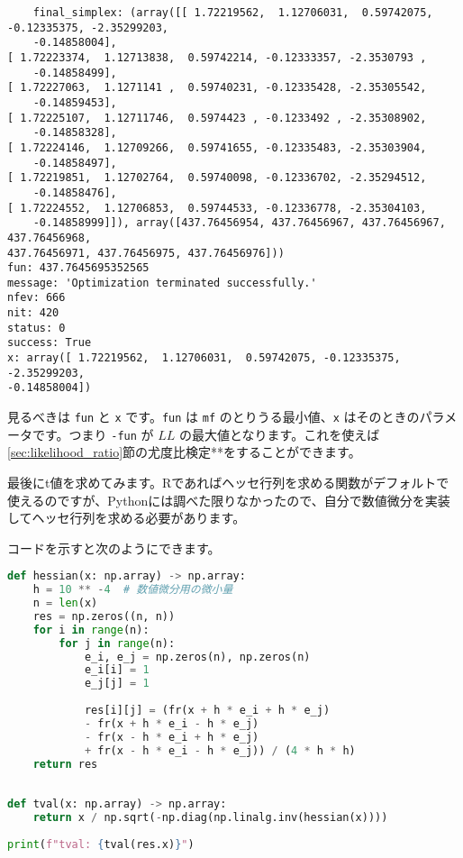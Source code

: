     \begin{lstlisting}
    final_simplex: (array([[ 1.72219562,  1.12706031,  0.59742075, -0.12335375, -2.35299203,
    -0.14858004],
[ 1.72223374,  1.12713838,  0.59742214, -0.12333357, -2.3530793 ,
    -0.14858499],
[ 1.72227063,  1.1271141 ,  0.59740231, -0.12335428, -2.35305542,
    -0.14859453],
[ 1.72225107,  1.12711746,  0.5974423 , -0.1233492 , -2.35308902,
    -0.14858328],
[ 1.72224146,  1.12709266,  0.59741655, -0.12335483, -2.35303904,
    -0.14858497],
[ 1.72219851,  1.12702764,  0.59740098, -0.12336702, -2.35294512,
    -0.14858476],
[ 1.72224552,  1.12706853,  0.59744533, -0.12336778, -2.35304103,
    -0.14858999]]), array([437.76456954, 437.76456967, 437.76456967, 437.76456968,
437.76456971, 437.76456975, 437.76456976]))
fun: 437.7645695352565
message: 'Optimization terminated successfully.'
nfev: 666
nit: 420
status: 0
success: True
x: array([ 1.72219562,  1.12706031,  0.59742075, -0.12335375, -2.35299203,
-0.14858004])
\end{lstlisting}

    見るべきは \lstinline{fun} と \lstinline{x} です。\lstinline{fun} は \lstinline{mf} のとりうる最小値、\lstinline{x} はそのときのパラメータです。つまり \lstinline{-fun} が $LL$ の最大値となります。これを使えば\ref{sec:likelihood_ratio}節の尤度比検定**をすることができます。

    最後にt値を求めてみます。Rであればヘッセ行列を求める関数がデフォルトで使えるのですが、Pythonには調べた限りなかったので、自分で数値微分を実装してヘッセ行列を求める必要があります。

    コードを示すと次のようにできます。

    \begin{lstlisting}[language=Python]
def hessian(x: np.array) -> np.array:
    h = 10 ** -4  # 数値微分用の微小量
    n = len(x)
    res = np.zeros((n, n))
    for i in range(n):
        for j in range(n):
            e_i, e_j = np.zeros(n), np.zeros(n)
            e_i[i] = 1
            e_j[j] = 1
            
            res[i][j] = (fr(x + h * e_i + h * e_j)
            - fr(x + h * e_i - h * e_j)
            - fr(x - h * e_i + h * e_j)
            + fr(x - h * e_i - h * e_j)) / (4 * h * h)
    return res
    
    
def tval(x: np.array) -> np.array:
    return x / np.sqrt(-np.diag(np.linalg.inv(hessian(x))))
    
print(f"tval: {tval(res.x)}")
\end{lstlisting}


